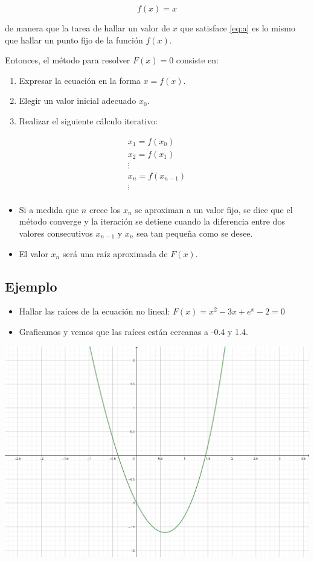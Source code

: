 \documentclass[openany]{book}
\providecommand{\tightlist}{%
  \setlength{\itemsep}{0pt}\setlength{\parskip}{0pt}}
\begin{document}
\[
f(x) = x
\]

de manera que la tarea de hallar un valor de \(x\) que satisface \eqref{eq:a} es lo mismo que hallar un punto fijo de la función \(f(x)\).

Entonces, el método para resolver \(F(x) = 0\) consiste en:

\begin{enumerate}
\def\labelenumi{\arabic{enumi}.}
\tightlist
\item
  Expresar la ecuación en la forma \(x = f(x)\).
\item
  Elegir un valor inicial adecuado \(x_0\).
\item
  Realizar el siguiente cálculo iterativo:
\end{enumerate}

\begin{gather*}
x_1 = f(x_0) \\
x_2 = f(x_1) \\
\vdots \\
x_n = f(x_{n-1}) \\
\vdots \\
\end{gather*}

\begin{itemize}
\tightlist
\item
  Si a medida que \(n\) crece los \(x_n\) se aproximan a un valor fijo, se dice que el método converge y la iteración se detiene cuando la diferencia entre dos valores consecutivos \(x_{n-1}\) y \(x_n\) sea tan pequeña como se desee.
\item
  El valor \(x_n\) será una raíz aproximada de \(F(x)\).
\end{itemize}

\hypertarget{ejemplo}{%
\subsection{Ejemplo}\label{ejemplo}}

\begin{itemize}
\tightlist
\item
  Hallar las raíces de la ecuación no lineal: \(F(x) = x^2-3x+e^x-2=0\)
\item
  Graficamos y vemos que las raíces están cercanas a -0.4 y 1.4.
\end{itemize}

\begin{center}\includegraphics[width=0.7\linewidth]{Plots/U2/f1} \end{center}
\end{document}
